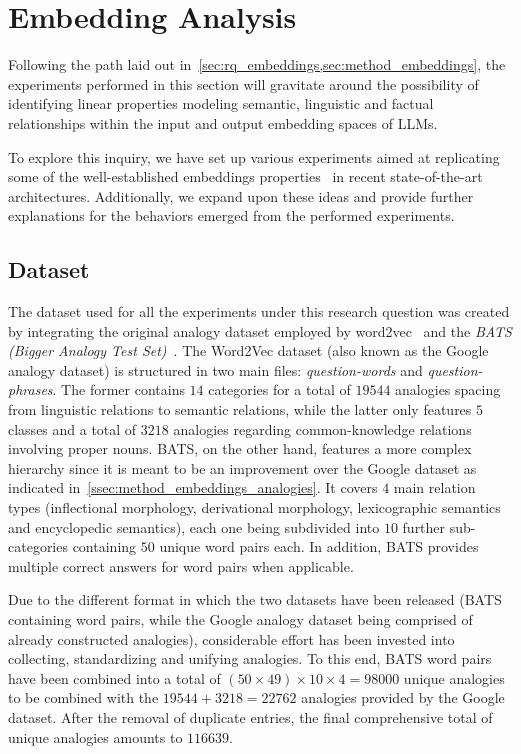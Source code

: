 \section{Embedding Analysis}\label{sec:exp_emb}

Following the path laid out in~\cref{sec:rq_embeddings,sec:method_embeddings}, the experiments performed in this section will gravitate around the possibility of identifying linear properties modeling semantic, linguistic and factual relationships within the input and output embedding spaces of LLMs.

To explore this inquiry, we have set up various experiments aimed at replicating some of the well-established embeddings properties~\cite{mikolov2013} in recent state-of-the-art architectures.
Additionally, we expand upon these ideas and provide further explanations for the behaviors emerged from the performed experiments.

\subsection{Dataset}

The dataset used for all the experiments under this research question was created by integrating the original analogy dataset employed by word2vec~\cite{mikolov2013} and the \emph{BATS (Bigger Analogy Test Set)}~\cite{drozd2016}.
The Word2Vec dataset (also known as the Google analogy dataset) is structured in two main files: \emph{question-words} and \emph{question-phrases}.
The former contains $14$ categories for a total of $19544$ analogies spacing from linguistic relations to semantic relations, while the latter only features $5$ classes and a total of $3218$ analogies regarding common-knowledge relations involving proper nouns.
BATS, on the other hand, features a more complex hierarchy since it is meant to be an improvement over the Google dataset as indicated in~\cref{ssec:method_embeddings_analogies}.
It covers $4$ main relation types (inflectional morphology, derivational morphology, lexicographic semantics and encyclopedic semantics), each one being subdivided into $10$ further sub-categories containing $50$ unique word pairs each.
In addition, BATS provides multiple correct answers for word pairs when applicable.

Due to the different format in which the two datasets have been released (BATS containing word pairs, while the Google analogy dataset being comprised of already constructed analogies), considerable effort has been invested into collecting, standardizing and unifying analogies.
To this end, BATS word pairs have been combined into a total of $(50 \times 49) \times 10 \times 4 = 98000$ unique analogies to be combined with the $19544 + 3218 = 22762$ analogies provided by the Google dataset.
After the removal of duplicate entries, the final comprehensive total of unique analogies amounts to $116639$.

